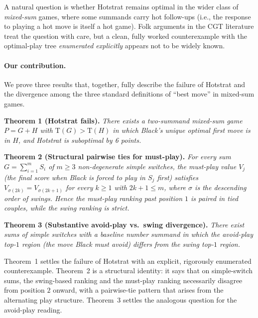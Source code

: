 \documentclass[11pt,a4paper]{amsart}
\theoremstyle{definition}
\theoremstyle{remark}
\newcommand{\Tt}{\mathrm{T}}
\begin{document}
A natural question is whether Hotstrat remains optimal in the wider class
of \emph{mixed-sum} games, where some summands carry hot follow-ups
(i.e., the response to playing a hot move is itself a hot game). Folk
arguments in the CGT literature treat the question with care, but a
clean, fully worked counterexample with the optimal-play tree
\emph{enumerated explicitly} appears not to be widely known.

\paragraph{Our contribution.}
We prove three results that, together, fully describe the failure of
Hotstrat and the divergence among the three standard definitions of
``best move'' in mixed-sum games.

\medskip
\noindent\textbf{Theorem 1 (Hotstrat fails).}
\emph{There exists a two-summand mixed-sum game $P = G + H$ with
$\Tt(G) > \Tt(H)$ in which Black's unique optimal first move is in $H$,
and Hotstrat is suboptimal by 6 points.}

\medskip
\noindent\textbf{Theorem 2 (Structural pairwise ties for must-play).}
\emph{For every sum $G = \sum_{i=1}^m S_i$ of $m \geq 3$ non-degenerate
simple switches, the must-play value $V_j$ (the final score when Black
is forced to play in $S_j$ first) satisfies
$V_{\sigma(2k)} = V_{\sigma(2k+1)}$ for every $k \geq 1$ with $2k+1 \leq m$,
where $\sigma$ is the descending order of swings. Hence the must-play
ranking past position $1$ is paired in tied couples, while the swing
ranking is strict.}

\medskip
\noindent\textbf{Theorem 3 (Substantive avoid-play vs.\ swing
divergence).}
\emph{There exist sums of simple switches with a baseline number summand
in which the avoid-play top-$1$ region (the move Black must avoid)
differs from the swing top-$1$ region.}

\medskip
Theorem~1 settles the failure of Hotstrat with an explicit, rigorously
enumerated counterexample. Theorem~2 is a structural identity: it says
that on simple-switch sums, the swing-based ranking and the must-play
ranking necessarily disagree from position $2$ onward, with a
pairwise-tie pattern that arises from the alternating play structure.
Theorem~3 settles the analogous question for the avoid-play reading.
\end{document}
